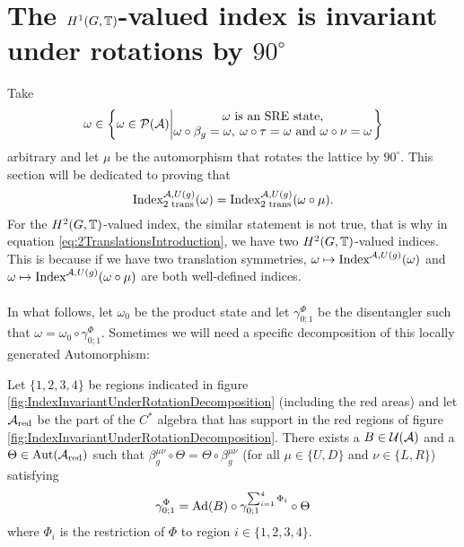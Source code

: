 \documentclass[11pt,a4paper,twoside]{article}
\numberwithin{equation}{section}
\begin{document}
	\section{The \texorpdfstring{$H^1(G,\TT)$}{}-valued index is invariant under rotations by \texorpdfstring{$90^\circ$}{}}\label{sec:H1ValuedIndexInvariantUnderRotations}
	Take
	\begin{equation}
		\omega\in\left\{\omega\in\PP(\AA)\left| \begin{matrix}\omega\text{ is an SRE state,}\\\omega\circ\beta_g=\omega,\:\omega\circ\tau=\omega\text{ and }\omega\circ\nu=\omega\end{matrix} \right.\right\}
	\end{equation}
	arbitrary and let $\mu$ be the automorphism that rotates the lattice by $90^\circ$. This section will be dedicated to proving that
	\begin{equation}
		\textrm{Index}_{\text{2 trans}}^{\AA,U(g)}(\omega)=\textrm{Index}_{\text{2 trans}}^{\AA,U(g)}(\omega\circ\mu).
	\end{equation}
	For the $H^2(G,\TT)$-valued index, the similar statement is not true, that is why in equation \eqref{eq:2TranslationsIntroduction}, we have two $H^2(G,\TT)$-valued indices. This is because if we have two translation symmetries, $\omega\mapsto\textrm{Index}^{\AA,U(g)}(\omega)$ and $\omega\mapsto\textrm{Index}^{\AA,U(g)}(\omega\circ\mu)$ are both well-defined indices.
	\\\\
	In what follows, let $\omega_0$ be the product state and let $\gamma^\Phi_{0;1}$ be the disentangler such that $\omega=\omega_0\circ\gamma^\Phi_{0;1}$. Sometimes we will need a specific decomposition of this locally generated Automorphism:
	
	\begin{lemma}\label{lem:DecompositionOfLGAInCross}
		Let $\{1,2,3,4\}$ be regions indicated in figure \ref{fig:IndexInvariantUnderRotationDecomposition} (including the red areas) and let $\AA_{\text{red}}$ be the part of the $C^*$ algebra that has support in the red regions of figure \ref{fig:IndexInvariantUnderRotationDecomposition}. There exists a $B\in\UU(\AA)$ and a $\Theta\in\Aut{\AA_{\text{red}}}$ such that $\beta^{\mu\nu}_g\circ\Theta=\Theta\circ\beta^{\mu\nu}_g$ (for all $\mu\in\{U,D\}$ and $\nu\in\{L,R\}$) satisfying
		\begin{equation}
			\gamma^\Phi_{0;1}=\Ad{B}\circ\gamma^{\sum_{i=1}^4\Phi_i}_{0;1}\circ\Theta
		\end{equation}
		where $\Phi_i$ is the restriction of $\Phi$ to region $i\in\{1,2,3,4\}$.
	\end{lemma}
\end{document}
